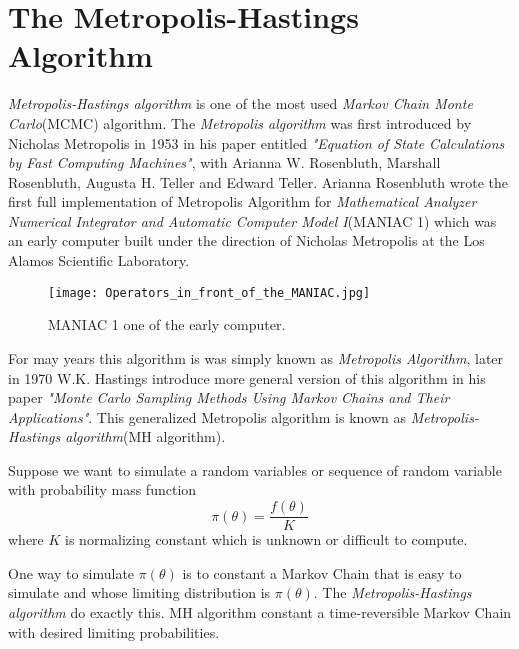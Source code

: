 \section{The Metropolis-Hastings Algorithm}

\textit{Metropolis-Hastings algorithm} is one of the most used \textit{Markov Chain Monte Carlo}(MCMC) algorithm.
The \textit{Metropolis algorithm} was first introduced by Nicholas Metropolis in 1953 in his paper entitled \textit{"Equation of State Calculations by Fast Computing Machines"}, with Arianna W. Rosenbluth, Marshall Rosenbluth, Augusta H. Teller and Edward Teller.
Arianna Rosenbluth wrote the first full implementation of Metropolis Algorithm for  \textit{Mathematical Analyzer Numerical Integrator and Automatic Computer Model I}(MANIAC 1) which was an early computer built under the direction of Nicholas Metropolis at the Los Alamos Scientific Laboratory.

\begin{figure}[H]
	\centering
	\texttt{[image: Operators\_in\_front\_of\_the\_MANIAC.jpg]}
	\caption{MANIAC 1 one of the early computer.}
	\label{MANIAC}
\end{figure}

For may years this algorithm is was simply known as \textit{Metropolis Algorithm}, later in 1970 W.K. Hastings introduce more general version of this algorithm in his paper \textit{"Monte Carlo Sampling Methods Using Markov Chains and Their Applications"}. This generalized Metropolis algorithm is known as \textit{Metropolis-Hastings algorithm}(MH algorithm).

Suppose we want to simulate a random variables or sequence of random variable with probability mass function
\begin{equation}
	\pi(\theta) = \frac{f(\theta)}{K}
\end{equation}
where $ K $ is normalizing constant which is unknown or difficult to compute.

One way to simulate $ \pi(\theta) $ is to constant a Markov Chain that is easy to simulate and whose limiting distribution is $ \pi(\theta) $.
The \textit{Metropolis-Hastings algorithm} do exactly this. MH algorithm constant a time-reversible Markov Chain with desired limiting probabilities.

